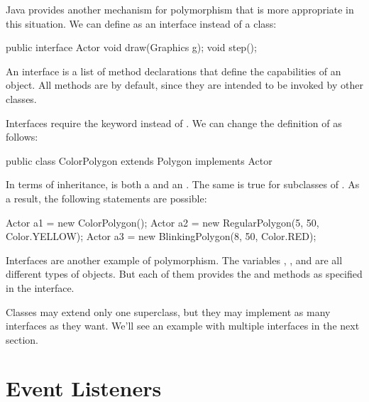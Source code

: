 Java provides another mechanism for polymorphism that is more appropriate in this situation.
We can define  as an interface instead of a class:

\begin{code}
public interface Actor {
    void draw(Graphics g);
    void step();
}
\end{code}

An interface is a list of method declarations that define the capabilities of an object.
All methods are  by default, since they are intended to be invoked by other classes.

Interfaces require the keyword  instead of .
We can change the definition of  as follows:

\begin{code}
public class ColorPolygon extends Polygon implements Actor
\end{code}

In terms of inheritance,  is both a  and an .
The same is true for subclasses of .
As a result, the following statements are possible:

\begin{code}
Actor a1 = new ColorPolygon();
Actor a2 = new RegularPolygon(5, 50, Color.YELLOW);
Actor a3 = new BlinkingPolygon(8, 50, Color.RED);
\end{code}

Interfaces are another example of polymorphism.
The variables , , and  are all different types of objects.
But each of them provides the  and  methods as specified in the  interface.

Classes may extend only one superclass, but they may implement as many interfaces as they want.
We'll see an example with multiple interfaces in the next section.


\section{Event Listeners}

